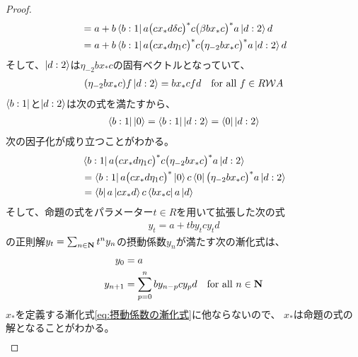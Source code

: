 {\begin{proof}
\begin{equation*}
\begin{split}
			&= a + b\mathinner{\langle{b:1}|}a\bigl(cx_*d\delta c\bigr)^*
				c\bigl(\beta bx_*c\bigr)^*a\mathinner{|{d:2}\rangle}d \\
			&= a + b\mathinner{\langle{b:1}|}a\bigl(cx_*d\eta_1 c\bigr)^*
				c\bigl(\eta_{-2} bx_*c\bigr)^*a\mathinner{|{d:2}\rangle}d \\
		\end{split}\end{equation*}
		そして、$\mathinner{|{d:2}\rangle}$は$\eta_{-2} bx_*c$の固有ベクトルとなっていて、
		\begin{equation*}\begin{split}
			(\eta_{-2} bx_*c)f\mathinner{|{d:2}\rangle} = bx_*cfd \quad\text{for all } f\in R{{\mathcal{W}}} A
		\end{split}\end{equation*}
		$\mathinner{\langle{b:1}|}$と$\mathinner{|{d:2}\rangle}$は次の式を満たすから、
		\begin{equation*}\begin{split}
			\mathinner{\langle{b:1}|}\mathinner{|{0}\rangle} = \mathinner{\langle{b:1}|}\mathinner{|{d:2}\rangle} = \mathinner{\langle{0}|}\mathinner{|{d:2}\rangle}
		\end{split}\end{equation*}
		次の因子化が成り立つことがわかる。
		\begin{equation*}\begin{split}
			&\mathinner{\langle{b:1}|}a\bigl(cx_*d\eta_1 c\bigr)^*
				c\bigl(\eta_{-2} bx_*c\bigr)^*a\mathinner{|{d:2}\rangle} \\
			&= \mathinner{\langle{b:1}|}a\bigl(cx_*d\eta_1 c\bigr)^*\mathinner{|{0}\rangle}
				c\mathinner{\langle{0}|}\bigl(\eta_{-2} bx_*c\bigr)^*a\mathinner{|{d:2}\rangle} \\
			&= \mathinner{\langle{b}|}a\mathinner{|{cx_*d}\rangle}c\mathinner{\langle{bx_*c}|}a\mathinner{|{d}\rangle} \\
		\end{split}\end{equation*}
		そして、命題の式をパラメーター$t\in R$を用いて拡張した次の式
		\begin{equation*}\begin{split}
			y_t = a + tby_tcy_td
		\end{split}\end{equation*}
		の正則解$y_t=\sum_{n\in\mathbf{N}}t^ny_n$の摂動係数$y_n$が満たす次の漸化式は、
		\begin{equation*}\begin{split}
			y_0 &= a \\
			y_{n+1} &= \sum_{p=0}^n by_{n-p}cy_pd \quad\text{for all } n\in\mathbf{N}
		\end{split}\end{equation*}
		$x_*$を定義する漸化式\eqref{eq:摂動係数の漸化式}に他ならないので、
		$x_*$は命題の式の解となることがわかる。
		\begin{equation*}\begin{split}

\end{split}
\end{equation*}
\end{proof}}
